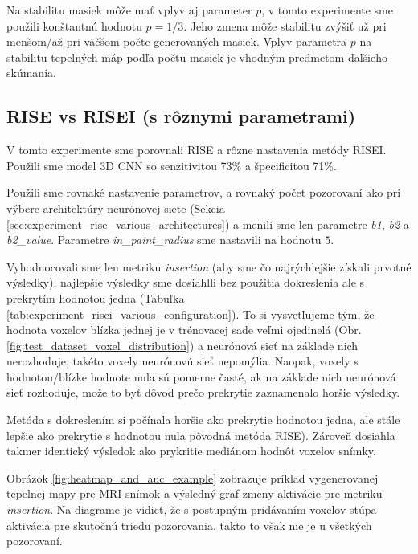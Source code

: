 Na stabilitu masiek môže mať vplyv aj parameter $p$, v tomto experimente sme použili konštantnú hodnotu $p = 1/3$. Jeho zmena môže stabilitu zvýšiť už pri menšom/až pri väčšom počte generovaných masiek. Vplyv parametra $p$ na stabilitu tepelných máp podľa počtu masiek je vhodným predmetom ďaľšieho skúmania.

\subsection{RISE vs RISEI (s rôznymi parametrami)}

V tomto experimente sme porovnali RISE a rôzne nastavenia metódy RISEI. Použili sme model 3D CNN so senzitivitou 73\% a špecificitou 71\%.

Použili sme rovnaké nastavenie parametrov, a rovnaký počet pozorovaní ako pri výbere architektúry neurónovej siete (Sekcia \ref{sec:experiment_rise_various_architectures}) a menili sme len parametre \textit{b1}, \textit{b2} a \textit{b2\_value}. Parametre \textit{in\_paint\_radius} sme nastavili na hodnotu $5$. 

Vyhodnocovali sme len metriku \textit{insertion} (aby sme čo najrýchlejšie získali prvotné výsledky), najlepšie výsledky sme dosiahlli bez použitia dokreslenia ale s prekrytím hodnotou jedna (Tabuľka \ref{tab:experiment_risei_various_configuration}). To si vysvetľujeme tým, že hodnota voxelov blízka jednej je v trénovacej sade veľmi ojedinelá (Obr. \ref{fig:test_dataset_voxel_distribution}) a neurónová sieť na základe nich nerozhoduje, takéto voxely neurónovú sieť nepomýlia. Naopak, voxely s hodnotou/blízke hodnote nula sú pomerne časté, ak na základe nich neurónová sieť rozhoduje, može to byť dôvod prečo prekrytie zaznamenalo horšie výsledky.

Metóda s dokreslením si počínala horšie ako prekrytie hodnotou jedna, ale stále lepšie ako prekrytie s hodnotou nula pôvodná metóda RISE). Zároveň dosiahla takmer identický výsledok ako prykritie mediánom hodnôt voxelov snímky.

Obrázok \ref{fig:heatmap_and_auc_example} zobrazuje príklad vygenerovanej tepelnej mapy pre MRI snímok a výsledný graf zmeny aktivácie pre metriku \textit{insertion}. Na diagrame je vidieť, že s postupným pridávaním voxelov stúpa aktivácia pre skutočnú triedu pozorovania, takto to však nie je u všetkých pozorovaní.

